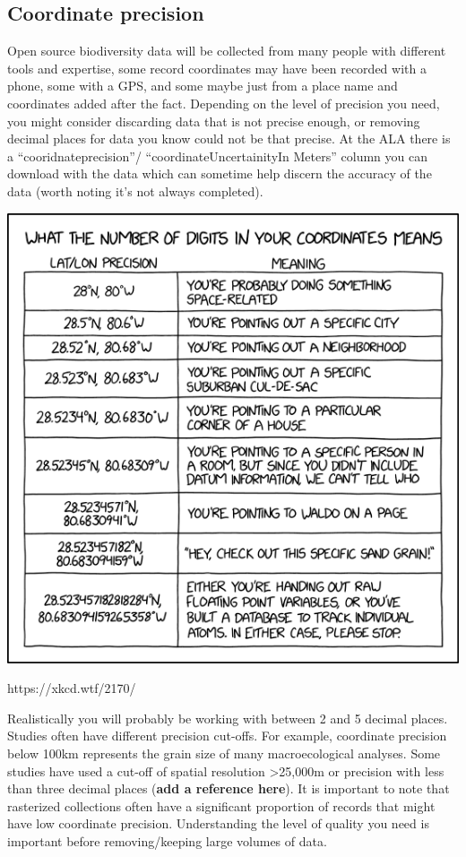 \documentclass[
  letterpaper,
  DIV=11,
  numbers=noendperiod,
  oneside]{scrreprt}
\begin{document}
\hypertarget{coordinate-precision}{%
\subsection{Coordinate precision}\label{coordinate-precision}}

Open source biodiversity data will be collected from many people with
different tools and expertise, some record coordinates may have been
recorded with a phone, some with a GPS, and some maybe just from a place
name and coordinates added after the fact. Depending on the level of
precision you need, you might consider discarding data that is not
precise enough, or removing decimal places for data you know could not
be that precise. At the ALA there is a ``cooridnateprecision''/
``coordinateUncertainityIn Meters'' column you can download with the
data which can sometime help discern the accuracy of the data (worth
noting it's not always completed).

\includegraphics{./images/image-613988507.png}

https://xkcd.wtf/2170/

Realistically you will probably be working with between 2 and 5 decimal
places. Studies often have different precision cut-offs. For example,
coordinate precision below 100km represents the grain size of many
macroecological analyses. Some studies have used a cut-off of spatial
resolution \textgreater25,000m or precision with less than three decimal
places (\textbf{add a reference here}). It is important to note that
rasterized collections often have a significant proportion of records
that might have low coordinate precision. Understanding the level of
quality you need is important before removing/keeping large volumes of
data.
\end{document}
